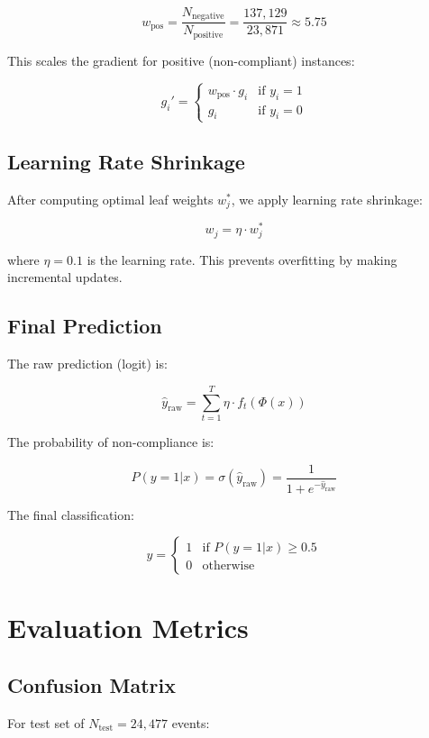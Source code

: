 \documentclass[12pt,a4paper]{article}
\begin{document}
$$w_{\text{pos}} = \frac{N_{\text{negative}}}{N_{\text{positive}}} = \frac{137{,}129}{23{,}871} \approx 5.75$$

This scales the gradient for positive (non-compliant) instances:

$$g_i' = \begin{cases}
w_{\text{pos}} \cdot g_i & \text{if } y_i = 1 \\
g_i & \text{if } y_i = 0
\end{cases}$$

\subsection{Learning Rate Shrinkage}

After computing optimal leaf weights $w_j^*$, we apply learning rate shrinkage:

$$w_j = \eta \cdot w_j^*$$

where $\eta = 0.1$ is the learning rate. This prevents overfitting by making incremental updates.

\subsection{Final Prediction}

The raw prediction (logit) is:

$$\hat{y}_{\text{raw}} = \sum_{t=1}^{T} \eta \cdot f_t(\Phi(x))$$

The probability of non-compliance is:

$$P(y = 1 | x) = \sigma(\hat{y}_{\text{raw}}) = \frac{1}{1 + e^{-\hat{y}_{\text{raw}}}}$$

The final classification:

$$\hat{y} = \begin{cases}
1 & \text{if } P(y = 1 | x) \geq 0.5 \\
0 & \text{otherwise}
\end{cases}$$

\section{Evaluation Metrics}

\subsection{Confusion Matrix}

For test set of $N_{\text{test}} = 24{,}477$ events:
\end{document}
